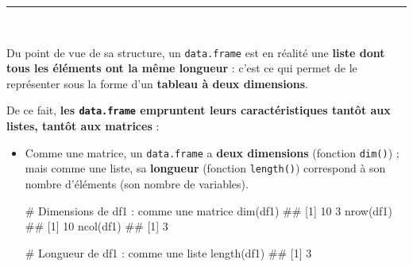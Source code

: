 \documentclass[12pt,twosided, notitlepage]{book}
\newenvironment{Shaded}{}{}
\newcommand{\KeywordTok}[1]{\textcolor[rgb]{0.00,0.00,1.00}{#1}}
\newcommand{\CommentTok}[1]{\textcolor[rgb]{0.00,0.50,0.00}{#1}}
\newcommand{\NormalTok}[1]{#1}
\renewenvironment{Shaded}{\begin{snugshade}}{\end{snugshade}}
\begin{document}
\begin{center}\rule{0.5\linewidth}{\linethickness}\end{center}

~

Du point de vue de sa structure, un \texttt{data.frame} est en réalité
une \textbf{liste dont tous les éléments ont la même longueur} : c'est
ce qui permet de le représenter sous la forme d'un \textbf{tableau à
deux dimensions}.

\begin{Shaded}
\end{Shaded}

De ce fait, \textbf{les \texttt{data.frame} empruntent leurs
caractéristiques tantôt aux listes, tantôt aux matrices} :

\begin{itemize}
\item
  Comme une matrice, un \texttt{data.frame} a \textbf{deux dimensions}
  (fonction
  \texttt{dim()})
  ; mais comme une liste, sa \textbf{longueur} (fonction
  \texttt{length()}) correspond à son nombre
  d'éléments (son nombre de variables).

\begin{Shaded}
\begin{Highlighting}[]
\CommentTok{# Dimensions de df1 : comme une matrice}
\KeywordTok{dim}\NormalTok{(df1)}
\NormalTok{  ## [1] 10  3}
\KeywordTok{nrow}\NormalTok{(df1)}
\NormalTok{  ## [1] 10}
\KeywordTok{ncol}\NormalTok{(df1)}
\NormalTok{  ## [1] 3}

\CommentTok{# Longueur de df1 : comme une liste}
\KeywordTok{length}\NormalTok{(df1)}
\NormalTok{  ## [1] 3}
\end{Highlighting}
\end{Shaded}
\end{itemize}

~
\end{document}
